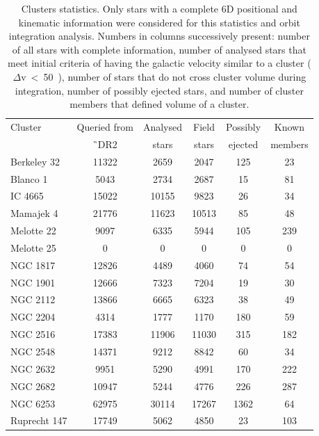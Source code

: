 \begin{table}
	\centering
	\caption{Clusters statistics. Only stars with a complete 6D positional and kinematic information were considered for this statistics and orbit integration analysis. Numbers in columns successively present: number of all stars with complete information, number of analysed stars that meet initial criteria of having the galactic velocity similar to a cluster ($\Delta$v~<~50~\kms), number of stars that do not cross cluster volume during integration, number of possibly ejected stars, and number of cluster members that defined volume of a cluster.}
	\begin{tabular}{l | c | c | c | c | c }
		\hline
		Cluster & Queried from & Analysed & Field & Possibly & Known \\
		 & \G\ DR2 & stars & stars & ejected & members \\
		\hline
		Berkeley 32  & 11322 & 2659 & 2047 & 125 & 23 \\ 
		Blanco 1     & 5043 & 2734 & 2687 & 15 & 81 \\
		IC 4665      & 15022 & 10155 & 9823 & 26 & 34 \\
		Mamajek 4    & 21776 & 11623 & 10513 & 85 & 48 \\
		Melotte 22   & 9097 & 6335 & 5944 & 105 & 239 \\
		Melotte 25   & 0 & 0 & 0 & 0 & 0 \\
		NGC 1817     & 12826 & 4489 & 4060 & 74 & 54 \\
		NGC 1901     & 12666 & 7323 & 7204 & 19 & 30 \\
		NGC 2112     & 13866 & 6665 & 6323 & 38 & 49 \\
		NGC 2204     & 4314 & 1777 & 1170 & 180 & 59 \\
		NGC 2516     & 17383 & 11906 & 11030 & 315 & 182 \\
		NGC 2548     & 14371 & 9212 & 8842 & 60 & 34 \\
		NGC 2632     & 9951 & 5290 & 4991 & 170 & 222 \\
		NGC 2682     & 10947 & 5244 & 4776 & 226 & 287 \\
		NGC 6253     & 62975 & 30114 & 17267 & 1362 & 64 \\
		Ruprecht 147 & 17749 & 5062 & 4850 & 23 & 103 \\
		\hline
	\end{tabular}
	\label{tab:cluster_stats}
\end{table}

